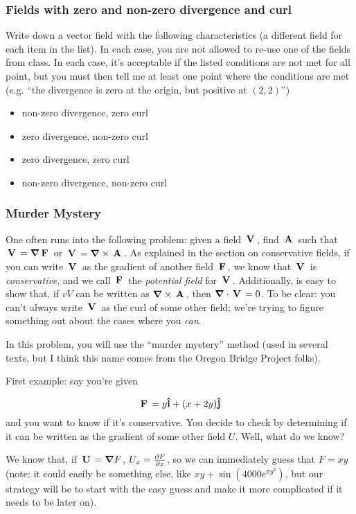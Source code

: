 \documentclass[12pt]{article}
\begin{document}
\subsubsection{Fields with zero and non-zero divergence and curl}
Write down a vector field with the following characteristics (a
different field for each item in the list). In each case, you are not
allowed to re-use one of the fields from class. In each case, it's
acceptable if the listed conditions are not met for all point, but you
must then tell me at least one point where the conditions are met
(e.g. ``the divergence is zero at the origin, but positive at
$(2,2)$'')
\begin{itemize}
\item non-zero divergence, zero curl
\item zero divergence, non-zero curl
\item zero divergence, zero curl
\item non-zero divergence, non-zero curl
\end{itemize}

\subsubsection{Murder Mystery}
One often runs into the following problem: given a field $\,\mathbf{V}\,$, find
$\,\mathbf{A}\,$ such that $\,\mathbf{V}\, = \mbox{\boldmath$ \nabla $} \,\mathbf{F}\,$ or $\,\mathbf{V}\,=\mbox{\boldmath$ \nabla $} \times \,\mathbf{A}\,$.  As explained
in the section on conservative fields, if you can write $\,\mathbf{V}\,$ as the
gradient of another field $\,\mathbf{F}\,$, we know that $\,\mathbf{V}\,$ is {\em
  conservative}, and we call $\,\mathbf{F}\,$ the {\em potential field} for
$\,\mathbf{V}\,$.  Additionally, is easy to show that, if $vV$ can be written as
$\mbox{\boldmath$ \nabla $} \times \,\mathbf{A}\,$, then $\mbox{\boldmath$ \nabla $} \cdot \,\mathbf{V}\,=0$. To be clear: you can't always write
$\,\mathbf{V}\,$ as the curl of some other field; we're trying to figure
something out about the cases where you {\em can}.

In this problem, you will use the ``murder mystery'' method (used in
several texts, but I think this name comes from the Oregon Bridge
Project folks).

First example: say you're given

\begin{equation}
  \,\mathbf{F}\, = y\mathbf{\hat{i}} + (x+2y)\mathbf{\hat{j}}
\end{equation}
and you want to know if it's conservative. You decide to check by
determining if it can be written as the gradient of some other field
$U$. Well, what do we know? 

We know that, if $\,\mathbf{U}\, = \mbox{\boldmath$ \nabla $} F$,
$U_x=\frac{\partial F}{\partial x}$, so we can immediately guess that $F = xy$ (note:
it could easily be something else, like $xy + \sin(4000e^{\pi y^2})$, but
our strategy will be to start with the easy guess and make it more
complicated if it needs to be later on). 
\end{document}
